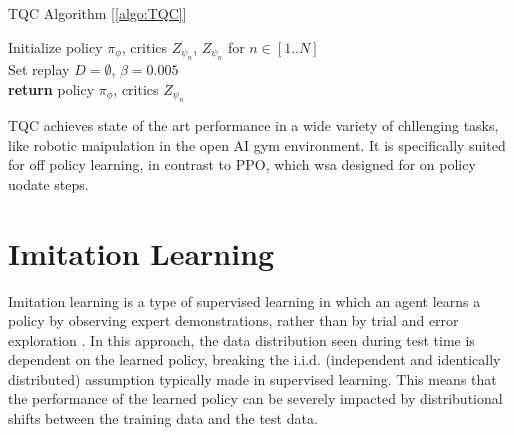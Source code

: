\begin{algorithm}
    \caption{TQC Algorithm [\ref{algo:TQC}]}
    \label{algo:TQC}
    \begin{algorithmic}
        \State Initialize policy $\pi_{\phi}$, critics $Z_{\psi_n}$, $Z_{\psi_n}$ for $n \in [1..N]$\\
        \State Set replay $D = \emptyset$, $\beta = 0.005$\\
        \State \textbf{return} policy $\pi_{\phi}$, critics $Z_{\psi_n}$
    \end{algorithmic}
\end{algorithm}
TQC achieves state of the art performance in a wide variety of chllenging tasks, like robotic maipulation in the open AI gym environment. It is specifically suited 
for off policy learning, in contrast to PPO, which wsa designed for on policy uodate steps.

\section{Imitation Learning}
Imitation learning is a type of supervised learning in which an agent learns a policy by observing expert demonstrations, 
rather than by trial and error exploration \cite{IL}. In this approach, the data distribution seen during test time is dependent on the learned policy, 
breaking the i.i.d. (independent and identically distributed) assumption typically made in supervised learning. This means that the performance of the 
learned policy can be severely impacted by distributional shifts between the training data and the test data. \\ \\

